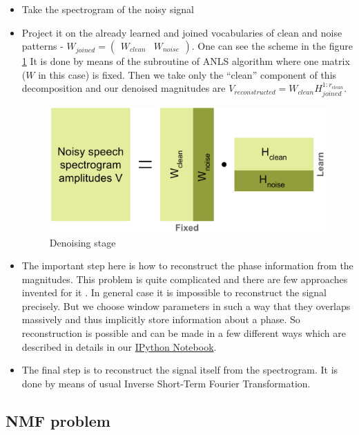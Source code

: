 \documentclass[11pt]{article}
\makeatletter
\def\maxwidth{\ifdim\Gin@nat@width>\linewidth\linewidth
    \else\Gin@nat@width\fi}
\makeatother
\begin{document}
\begin{itemize}
  \item Take the spectrogram of the noisy signal
  \item Project it on the already learned and joined vocabularies of clean and noise patterns - $W_{joined} = \begin{pmatrix} W_{clean} & W_{noise} \end{pmatrix}$. One can see the scheme in the figure \ref{fig:denoising} It is done by means of the subroutine of ANLS algorithm where one matrix ($W$ in this case) is fixed. Then we take only the “clean” component of this decomposition and our denoised magnitudes are $V_{reconstructed} = W_{clean}H_{joined}^{1:r_{clean}}$.
\begin{figure}[H]
\centering
\includegraphics[width=0.9\maxwidth]{denoising_stage.png}
\caption{Denoising stage}
\label{fig:denoising}
\end{figure}
  \item The important step here is how to reconstruct the phase information from the magnitudes. This problem is quite complicated and there are few approaches invented for it \cite{griffin, sturmel}. In general case it is impossible to reconstruct the signal precisely. But we choose window parameters in such a way that they overlaps massively and thus implicitly store information about a phase. So reconstruction is possible and can be made in a few different ways which are described in details in our \href{https://github.com/elejke/CNMF-ASR/blob/master/code/Denoising_Demo.ipynb}{IPython Notebook}.
  \item The final step is to reconstruct the signal itself from the spectrogram. It is done by means of usual Inverse Short-Term Fourier Transformation.
\end{itemize}

\subsection{NMF problem}
\end{document}
